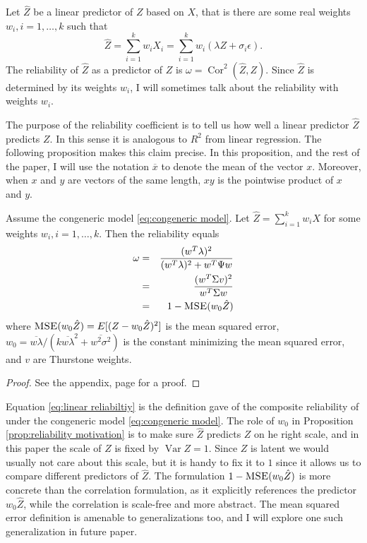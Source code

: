 \documentclass[twoside]{article}
\DeclareMathOperator{\Var}{Var}
\DeclareMathOperator{\Cor}{Cor}
\DeclareMathOperator{\MSE}{\textsc{MSE}}
\begin{document}
Let $\hat{Z}$ be a linear predictor of $Z$ based on $X$, that
is there are some real weights $w_{i},i=1,\ldots,k$ such that
\begin{equation}
\label{eq:Linear predictor}
\hat{Z} =  \sum_{i=1}^{k}w_{i}X_i =  \sum_{i=1}^{k}w_{i}\left(\lambda Z+\sigma_{i}\epsilon\right).\nonumber 
\end{equation}
The reliability of $\hat{Z}$ as a predictor of $Z$ is $\omega =\Cor^{2}(\hat{Z},Z)$. Since $\hat{Z}$ is determined by its weights $w_i$, I will sometimes talk about the reliability with weights $w_i$.

The purpose of the reliability coefficient is to tell us how well a linear predictor $\hat{Z}$ predicts $Z$. In this sense it is analogous to $R^2$ from linear regression. The following proposition makes this claim precise. In this proposition, and the rest of the paper, I will use the notation $\overline{x}$ to denote the mean of the vector $x$. Moreover, when $x$ and $y$ are vectors of the same length, $xy$ is the pointwise product of $x$ and $y$.

\begin{prop}
\label{prop:reliability motivation}Assume the congeneric model \eqref{eq:congeneric model}. Let $\hat{Z}=\sum_{i=1}^{k}w_{i}X$
for some weights $w_{i},i=1,\ldots,k$. Then the reliability equals
\begin{eqnarray}
\omega & = & \frac{(w^{T}\lambda)^{2}}{(w^{T}\lambda)^{2}+w^{T}\Psi w}\label{eq:linear reliabiltiy}\\
 & = & \frac{(w^{T}\Sigma v)^{2}}{w^{T}\Sigma w} \nonumber \\
 & = & 1- \MSE (w_{0}\hat{Z})\nonumber 
\end{eqnarray}
where $\MSE (w_{0}\hat{Z})=E[(Z-w_{0}\hat{Z})^{2}]$ is the
mean squared error, $w_{0}=\overline{w\lambda}/(k\overline{w\lambda}^{2}+\overline{w^{2}\sigma^{2}})$ is the constant minimizing the mean squared error, and $v$ are Thurstone weights.
\end{prop}
\begin{proof}
See the appendix, page \pageref{proof:reliability motivation} for a proof.
\end{proof}

Equation \eqref{eq:linear reliabiltiy} is the definition \citet[][p. 112]{Joreskog1971-nn} gave of the composite reliability of under the congeneric model \eqref{eq:congeneric model}. The role of $w_0$ in Proposition \ref{prop:reliability motivation} is to make sure $\hat{Z}$ predicts $Z$ on he right scale, and in this paper the scale of $Z$ is fixed by $\Var Z = 1$. Since $Z$ is latent we would usually not care about this scale, but it is handy to fix it to $1$ since it allows us to compare different predictors of $\hat{Z}$. The formulation $1-\MSE (w_{0}\hat{Z})$ is more concrete than the correlation formulation, as it explicitly references the predictor $w_{0}\hat{Z}$, while the correlation is scale-free and more abstract. The mean squared error definition is amenable to generalizations too, and I will explore one such generalization in future paper. 
\end{document}
